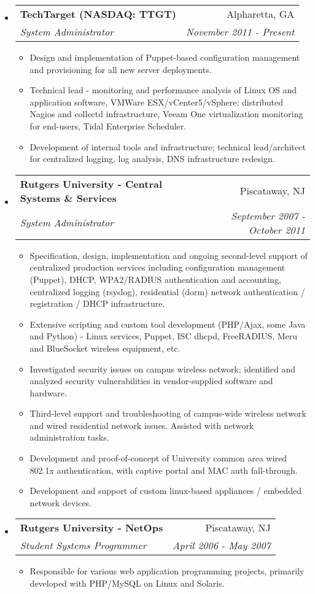 \documentclass[letterpaper,11pt]{article}
\makeatletter
\newcommand{\resitem}[1]{\item #1 \vspace{-2pt}}
\newcommand{\ressubheading}[4]{
\begin{tabular*}{7.0in}{l@{\extracolsep{\fill}}r}
		\textbf{#1} & #2 \\
		\textit{#3} & \textit{#4} \\
\end{tabular*}\vspace{-6pt}}
\makeatother
\begin{document}
\begin{itemize}
\item
	\ressubheading{TechTarget  (NASDAQ: TTGT)}{Alpharetta, GA}{System Administrator}{November 2011 - Present}
	\begin{itemize}
		\resitem{Design and implementation of Puppet-based configuration management and provisioning for all new server deployments.}
                \resitem{Technical lead - monitoring and performance analysis of Linux OS and application software, VMWare ESX/vCenter5/vSphere; distributed Nagios and collectd infrastructure, Veeam One virtualization monitoring for end-users, Tidal Enterprise Scheduler.}
                \resitem{Development of internal tools and infrastructure; technical lead/architect for centralized logging, log analysis, DNS infrastructure redesign.}
	\end{itemize}
\pagebreak
\item
	\ressubheading{Rutgers University - Central Systems \&
          Services}{Piscataway, NJ}{System Administrator}{September 2007 - October 2011}
	\begin{itemize}
                \resitem{Specification, design, implementation and ongoing second-level support of centralized production services including configuration management (Puppet), DHCP, WPA2/RADIUS authentication and accounting, centralized logging (rsyslog), residential (dorm) network authentication / registration / DHCP infrastructure.}
                \resitem{Extensive scripting and custom tool development
                  (PHP/Ajax, some Java and Python)
                  - Linux services, Puppet, ISC dhcpd, FreeRADIUS, Meru and BlueSocket wireless equipment, etc.}
                \resitem{Investigated security issues on campus wireless network; identified and analyzed security vulnerabilities in vendor-supplied software and hardware.}
                \resitem{Third-level support and troubleshooting of campus-wide wireless network and wired residential network issues. Assisted with network administration tasks.}
		\resitem{Development and proof-of-concept of University common area wired 802.1x authentication, with captive portal and MAC auth fall-through.}
		\resitem{Development and support of custom linux-based appliances / embedded network devices.}
	\end{itemize}

\item
	\ressubheading{Rutgers University - NetOps}{Piscataway, NJ}{Student Systems Programmer}{April 2006 - May 2007}
	\begin{itemize}
		\resitem{Responsible for various web application programming projects, primarily developed with
                  PHP/MySQL on Linux and Solaris.}
	\end{itemize}

\end{itemize}
\end{document}
